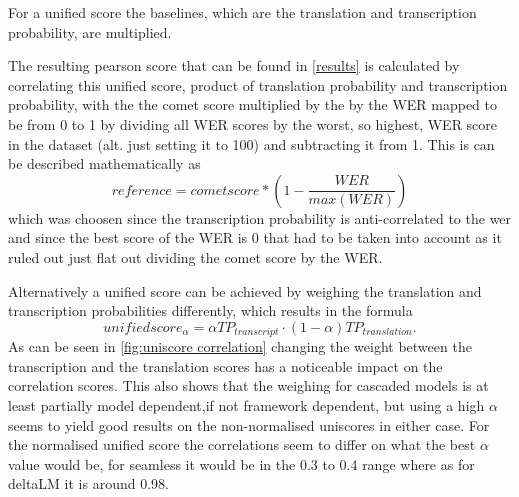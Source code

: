 For a unified score the baselines, which are the translation and transcription probability, are multiplied. 

The resulting pearson score that can be found in \autoref{results} is calculated by correlating this unified score, product of translation probability and transcription probability, with the the comet score multiplied by the by the WER mapped to be from 0 to 1 by dividing all WER scores by the worst, so highest, WER score in the dataset (alt. just setting it to 100) and subtracting it from 1. 
This is can be described mathematically as 
$$reference = cometscore*(1-\frac{WER}{max(WER)})$$
which was choosen since the transcription probability is anti-correlated to the wer and since the best score of the WER is 0 that had to be taken into account as it ruled out just flat out dividing the comet score by the WER.

Alternatively a unified score can be achieved by weighing the translation and transcription probabilities differently, which results in the formula $$unifiedscore_\alpha= \alpha TP_{transcript} \cdot (1-\alpha)TP_{translation}.$$ 
As can be seen in \autoref{fig:uniscore correlation} changing the weight between the transcription and the translation scores has a noticeable impact on the correlation scores. 
This also shows that the weighing for cascaded models is at least partially model dependent,if not framework dependent, but using a high $\alpha$ seems to yield good results on the non-normalised uniscores in either case. 
For the normalised unified score the correlations seem to differ on what the best $\alpha$ value would be, for seamless it would be in the 0.3 to 0.4 range where as for deltaLM it is around 0.98. 

